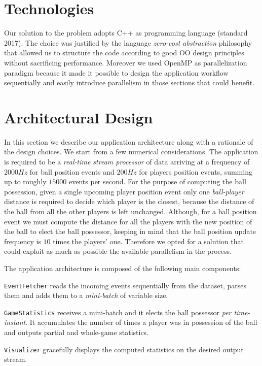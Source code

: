 \documentclass[a4paper, 11pt]{article}
\begin{document}
\begin{multicols}{2}
\section{Technologies}
Our solution to the problem adopts C++ as programming language (standard 2017). The choice was justified by the language \emph{zero-cost abstraction} philosophy that allowed us to structure the code according to good OO design principles without sacrificing performance. Moreover we used OpenMP \cite{omp} as parallelization paradigm because it made it possible to design the application workflow sequentially and easily introduce parallelism in those sections that could benefit.

\section{Architectural Design}
In this section we describe our application architecture along with a rationale of the design choices. We start from a few numerical considerations. The application is required to be a \textit{real-time stream processor} of data arriving at a frequency of $2000Hz$ for ball position events and $200Hz$ for players position events, summing up to roughly $15000$ events per second. For the purpose of computing the ball possession, given a single upcoming player position event only one \textit{ball-player} distance is required to decide which player is the closest, because the distance of the ball from all the other players is left unchanged. Although, for a ball position event we must compute the distance for all the players with the new position of the ball to elect the ball possessor, keeping in mind that the ball position update frequency is $10$ times the players' one. Therefore we opted for a solution that could exploit as much as possible the available parallelism in the process.

The application architecture is composed of the following main components:
\begin{enumerate*}[(a)]
    \item \texttt{EventFetcher} reads the incoming events sequentially from the dataset, parses them and adds them to a \textit{mini-batch} of variable size.
    \item \texttt{GameStatistics} receives a mini-batch and it elects the ball possessor \emph{per time-instant}. It accumulates the number of times a player was in possession of the ball and outputs partial and whole-game statistics.
    \item \texttt{Visualizer} gracefully displays the computed statistics on the desired output stream.
\end{enumerate*}


\end{multicols}
\end{document}
